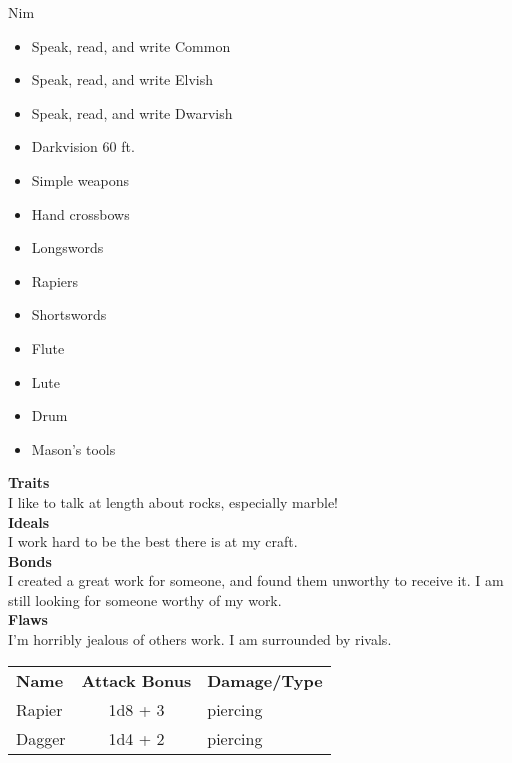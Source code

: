 \documentclass[10pt,twoside,twocolumn]{article}
\begin{document}
\begin{charactersheet}{Nim}
        \begin{itemize}
            \item Speak, read, and write Common
            \item Speak, read, and write Elvish
            \item Speak, read, and write Dwarvish
            \item Darkvision 60 ft.
            \item Simple weapons
            \item Hand crossbows
            \item Longswords
            \item Rapiers
            \item Shortswords
            \item Flute
            \item Lute
            \item Drum
            \item Mason's tools
        \end{itemize}

        \textbf{Traits} \\
        I like to talk at length about rocks, especially marble! \\

        \textbf{Ideals} \\
        I work hard to be the best there is at my craft. \\

        \textbf{Bonds} \\
        I created a great work for someone, and found them unworthy to receive
        it. I am still looking for someone worthy of my work. \\

        \textbf{Flaws} \\
        I'm horribly jealous of others work. I am surrounded by rivals. \\


        \begin{tabular}{lcl}
            \textbf{Name} & \textbf{Attack Bonus} & \textbf{Damage/Type} \\
            Rapier & 1d8 + 3 & piercing \\
            Dagger & 1d4 + 2 & piercing
        \end{tabular}


\end{charactersheet}
\end{document}
